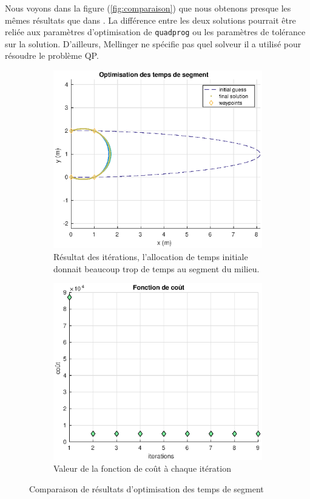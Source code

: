 Nous voyons dans la figure (\ref{fig:comparaison}) que nous obtenons presque les mêmes résultats que dans \cite{Mellinger2011}. La différence entre les deux solutions pourrait  être reliée aux paramètres d'optimisation de \texttt{quadprog} ou les paramètres de tolérance sur la solution. D'ailleurs, Mellinger ne spécifie pas quel solveur il a utilisé pour résoudre le problème QP.


\begin{figure}[htp]
\centering
\begin{subfigure}{.45\textwidth}
  \centering
  \includegraphics[width=1.2\textwidth]{fig/arc_time_opt}
  \caption{Résultat des itérations, l'allocation de temps initiale donnait beaucoup trop de temps au segment du milieu.}
\end{subfigure}%
\begin{subfigure}{.45\textwidth}
  \centering
  \includegraphics[width=\textwidth]{fig/cost}
  \caption{Valeur de la fonction de coût à chaque itération}
  \label{fig:sub2}
\end{subfigure}
\caption{Comparaison de résultats d'optimisation des temps de segment}
\label{fig:comparaison_opt_temps}
\end{figure}


